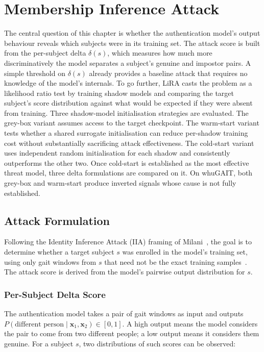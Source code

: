 \chapter{Membership Inference Attack}
\label{ch:mia}

The central question of this chapter is whether the authentication model's output behaviour reveals which subjects were in its training set. The attack score is built from the per-subject delta $\delta(s)$, which measures how much more discriminatively the model separates a subject's genuine and impostor pairs. A simple threshold on $\delta(s)$ already provides a baseline attack that requires no knowledge of the model's internals. To go further, LiRA casts the problem as a likelihood ratio test by training shadow models and comparing the target subject's score distribution against what would be expected if they were absent from training. Three shadow-model initialisation strategies are evaluated. The grey-box variant assumes access to the target checkpoint. The warm-start variant tests whether a shared surrogate initialisation can reduce per-shadow training cost without substantially sacrificing attack effectiveness. The cold-start variant uses independent random initialisation for each shadow and consistently outperforms the other two. Once cold-start is established as the most effective threat model, three delta formulations are compared on it. On whuGAIT, both grey-box and warm-start produce inverted signals whose cause is not fully established.

\section{Attack Formulation}
\label{sec:mia_formulation}

Following the Identity Inference Attack (IIA) framing of Milani~\cite{milani2024gait}, the goal is to determine whether a target subject $s$ was enrolled in the model's training set, using only gait windows from $s$ that need not be the exact training samples~\cite{li2022userlevel}. The attack score is derived from the model's pairwise output distribution for $s$.

\subsection{Per-Subject Delta Score}
\label{ssec:mia_delta}

The authentication model takes a pair of gait windows as input and outputs $P(\text{different person} \mid \mathbf{x}_1, \mathbf{x}_2) \in [0, 1]$. A high output means the model considers the pair to come from two different people; a low output means it considers them genuine. For a subject $s$, two distributions of such scores can be observed:

